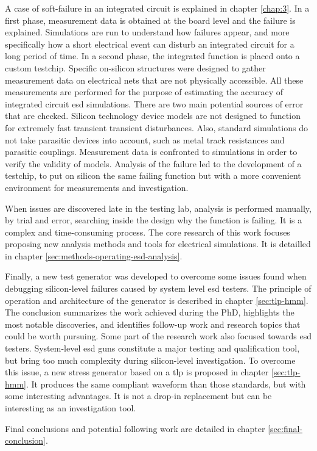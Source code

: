 %
A case of soft-failure in an integrated circuit is explained in chapter \ref{chap:3}.
In a first phase, measurement data is obtained at the board level and the failure is explained.
Simulations are run to understand how failures appear, and more specifically how a short electrical event can disturb an integrated circuit for a long period of time.
In a second phase, the integrated function is placed onto a custom testchip.
Specific on-silicon structures were designed to gather measurement data on electrical nets that are not physically accessible.
All these measurements are performed for the purpose of estimating the accuracy of integrated circuit \gls{esd} simulations.
There are two main potential sources of error that are checked.
Silicon technology device models are not designed to function for extremely fast transient transient disturbances.
Also, standard simulations do not take parasitic devices into account, such as metal track resistances and parasitic couplings.
Measurement data is confronted to simulations in order to verify the validity of models.
Analysis of the failure led to the development of a testchip, to put on silicon the same failing function but with a more convenient environment for measurements and investigation.

%
When issues are discovered late in the testing lab, analysis is performed manually, by trial and error, searching inside the design why the function is failing.
It is a complex and time-consuming process.
The core research of this work focuses proposing new analysis methods and tools for electrical simulations.
It is detailled in chapter \ref{sec:methods-operating-esd-analysis}.

%
Finally, a new test generator was developed to overcome some issues found when debugging silicon-level failures caused by system level \gls{esd} testers.
The principle of operation and architecture of the generator is described in chapter \ref{sec:tlp-hmm}.
The conclusion summarizes the work achieved during the PhD, highlights the most notable discoveries, and identifies follow-up work and research topics that could be worth pursuing.
Some part of the research work also focused towards \gls{esd} testers.
System-level \gls{esd} guns \cite{iec61000-4-2, iso10605} constitute a major testing and qualification tool, but bring too much complexity during silicon-level investigation.
To overcome this issue, a new stress generator based on a \gls{tlp} is proposed in chapter \ref{sec:tlp-hmm}.
It produces the same compliant waveform than those standards, but with some interesting advantages.
It is not a drop-in replacement but can be interesting as an investigation tool.

%
Final conclusions and potential following work are detailed in chapter \ref{sec:final-conclusion}.
